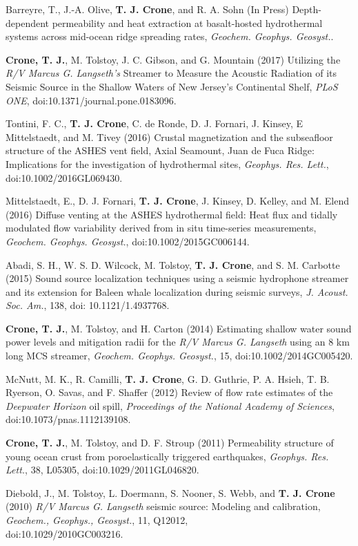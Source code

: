 \documentclass[11pt]{res}
\begin{document}
\begin{resume}
Barreyre, T., J.-A. Olive, {\bf T. J. Crone}, and R. A. Sohn (In Press) Depth-dependent permeability and heat extraction at basalt-hosted hydrothermal systems across mid-ocean ridge spreading rates, {\em Geochem. Geophys. Geosyst.}.

{\bf Crone, T. J.}, M. Tolstoy, J. C. Gibson, and G. Mountain (2017)
Utilizing the \textit{R/V Marcus G. Langseth's} Streamer to Measure the Acoustic Radiation of its Seismic Source in the Shallow Waters of New Jersey's Continental Shelf, \textit{PLoS ONE}, doi:10.1371/journal.pone.0183096.

Tontini, F. C., {\bf T. J. Crone}, C. de Ronde, D. J. Fornari, J. Kinsey, E Mittelstaedt,  and M. Tivey (2016) Crustal magnetization and the subseafloor structure of the ASHES vent field, Axial Seamount, Juan de Fuca Ridge: Implications for the investigation of hydrothermal sites, {\em Geophys. Res. Lett.}, doi:10.1002/2016GL069430.

Mittelstaedt, E., D. J. Fornari, {\bf T. J. Crone}, J. Kinsey, D. Kelley, and M. Elend (2016) Diffuse venting at the ASHES hydrothermal field: Heat flux and tidally modulated flow variability derived from in situ time-series measurements, {\em Geochem. Geophys. Geosyst.}, \linebreak doi:10.1002/2015GC006144.

Abadi, S. H., W. S. D. Wilcock, M. Tolstoy, {\bf T. J. Crone}, and S. M. Carbotte (2015) Sound source localization techniques using a seismic hydrophone streamer and its extension for Baleen whale localization during seismic surveys, {\em J. Acoust. Soc. Am.}, 138, doi: 10.1121/1.4937768.

{\bf Crone, T. J.}, M. Tolstoy, and H. Carton (2014) Estimating shallow water sound power levels and mitigation radii for the {\em R/V Marcus G. Langseth} using an 8 km long MCS streamer, {\em Geochem. Geophys. Geosyst.}, 15, doi:10.1002/2014GC005420.

McNutt, M. K., R. Camilli, {\bf T. J. Crone}, G. D. Guthrie, P. A. Hsieh, T. B. Ryerson, O. Savas, and F. Shaffer (2012) Review of flow rate estimates of the {\em Deepwater Horizon} oil spill, {\em Proceedings of the National Academy of Sciences}, doi:10.1073/pnas.1112139108.

{\bf Crone, T. J.}, M. Tolstoy, and D. F. Stroup (2011) Permeability structure of young ocean crust from poroelastically triggered earthquakes, {\em Geophys. Res. Lett.}, 38, L05305, doi:10.1029/2011GL046820.

Diebold, J., M. Tolstoy, L. Doermann, S. Nooner, S. Webb, and {\bf T. J. Crone} (2010) {\em R/V Marcus G. Langseth} seismic source: Modeling and calibration, {\em Geochem., Geophys., Geosyst.}, 11, Q12012,\\doi:10.1029/2010GC003216.


\end{resume}
\end{document}
